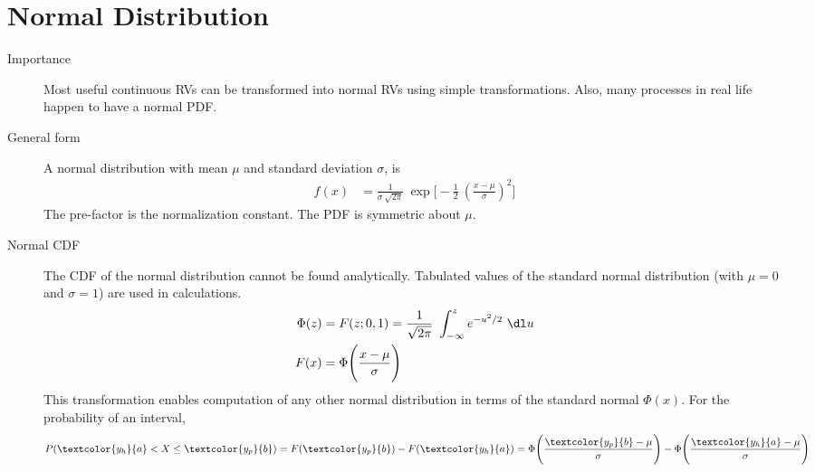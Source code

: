 \section{Normal Distribution}

\begin{description}
    \item[Importance] Most useful continuous RVs can be transformed into normal RVs using
          simple transformations. Also, many processes in real life happen to have a
          normal PDF.

    \item[General form] A normal distribution with mean $ \mu $ and standard deviation
          $ \sigma $, is
          \begin{align}
              f(x) & = \frac{1}{\sigma\ \sqrt{2\pi}}\ \exp\Bigg[ -\frac{1}{2}
                  \ \left( \frac{x-\mu}{\sigma} \right)^2 \Bigg]
          \end{align}
          The pre-factor is the normalization constant. The PDF is symmetric about
          $ \mu $.

    \item[Normal CDF] The CDF of the normal distribution cannot be found analytically.
          Tabulated values of the standard normal distribution (with $ \mu = 0$ and
          $ \sigma = 1 $) are used in calculations.
          \begin{align}
              \Phi(z) & = F(z;0,1) = \frac{1}{\sqrt{2\pi}}\ \int_{-\infty}^{z}
              e^{-u^2/2}\ \dl u                                                \\
              F(x)    & = \Phi\Bigg( \frac{x-\mu}{\sigma} \Bigg)
          \end{align}
          This transformation enables computation of any other normal distribution in
          terms of the standard normal $ \Phi(x) $. For the probability of an interval,
          \begin{align}
              P(\textcolor{y_h}{a} < X \leq \textcolor{y_p}{b}) & =
              F(\textcolor{y_p}{b}) - F(\textcolor{y_h}{a}) =
              \Phi\Bigg( \frac{\textcolor{y_p}{b}-\mu}{\sigma} \Bigg)
              - \Phi\Bigg( \frac{\textcolor{y_h}{a}-\mu}{\sigma} \Bigg)
          \end{align}


\end{description}
